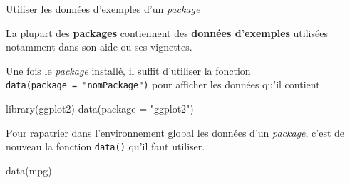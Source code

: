 \documentclass[12pt,ignorenonframetext,]{beamer}
\newenvironment{Shaded}{}{}
\newcommand{\KeywordTok}[1]{\textcolor[rgb]{0.00,0.00,1.00}{#1}}
\newcommand{\DataTypeTok}[1]{#1}
\newcommand{\StringTok}[1]{\textcolor[rgb]{0.00,0.50,0.50}{#1}}
\newcommand{\NormalTok}[1]{#1}
\renewenvironment{Shaded}{\begin{snugshade}}{\end{snugshade}}
\begin{document}
\begin{frame}[fragile]{Utiliser les données d'exemples d'un
\emph{package}}

La plupart des \textbf{packages} contiennent des \textbf{données
d'exemples} utilisées notamment dans son aide ou ses vignettes.

Une fois le \emph{package} installé, il suffit d'utiliser la fonction
\texttt{data(package\ =\ "nomPackage")} pour afficher les données qu'il
contient.

\begin{Shaded}
\begin{Highlighting}[]
\KeywordTok{library}\NormalTok{(ggplot2)}
\KeywordTok{data}\NormalTok{(}\DataTypeTok{package =} \StringTok{"ggplot2"}\NormalTok{)}
\end{Highlighting}
\end{Shaded}

\pause Pour \og rapatrier \fg{} dans l'environnement global les données
d'un \emph{package}, c'est de nouveau la fonction \texttt{data()} qu'il
faut utiliser.

\begin{Shaded}
\begin{Highlighting}[]
\KeywordTok{data}\NormalTok{(mpg)}
\end{Highlighting}
\end{Shaded}

\end{frame}
\end{document}
